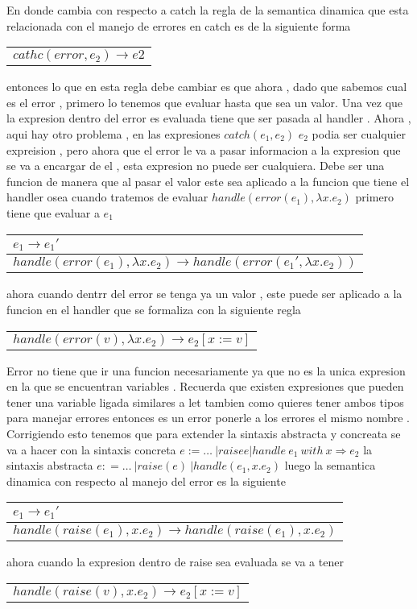 \documentclass[12p]{article}
\makeatletter
\newcommand{\logicarg}[2]{
  \begin{tabular}[t]{@{}l@{}}
    #1 \\ \hline #2 
  \end{tabular}
}
\makeatother
\begin{document}
En donde cambia con respecto a catch 
la regla de la semantica dinamica que esta relacionada con el manejo de errores en catch es de la 
siguiente forma \logicarg{}{$cathc(error,e_2) \rightarrow e2$} entonces lo que en esta regla debe cambiar 
es que ahora , dado que sabemos cual es el error , primero lo tenemos que evaluar hasta que sea un valor.
Una vez que la expresion dentro del error es evaluada tiene que ser pasada al handler . Ahora , aqui hay 
otro problema , en las expresiones $catch(e_1,e_2)$ $e_2$ podia ser cualquier expreision , pero ahora que 
el error le va a pasar informacion a la expresion que se va a encargar de el , esta expresion no puede ser 
cualquiera. Debe ser una funcion de manera que al pasar el valor este sea aplicado a la funcion que tiene  
el handler 
osea cuando tratemos de evaluar $handle(error(e_1),\lambda x. e_2)$ primero tiene que evaluar a $e_1$
\logicarg
{$e_1 \rightarrow e_1'$}
{$handle(error(e_1),\lambda x.e_2) \rightarrow handle(error(e_1',\lambda x.e_2))$}
ahora cuando dentrr del error se tenga ya un valor , este puede ser aplicado a la funcion en el handler 
que se formaliza con la siguiente regla
\logicarg{}{$handle(error(v),\lambda x.e_2 ) \rightarrow e_2[x:=v]$}

Error no tiene que ir una funcion necesariamente ya que no es la unica expresion en la que se encuentran 
variables . Recuerda que existen expresiones que pueden tener una variable ligada similares a let 
tambien como quieres tener ambos tipos para manejar errores entonces es un error ponerle a los errores el 
mismo nombre . Corrigiendo esto tenemos que para extender la sintaxis abstracta y concreata se va a hacer 
con 
la sintaxis concreta 
$e := \dots \ | raise e | handle \ e_1 \ with \ x \Rightarrow e_2$
la sintaxis abstracta 
$e : = \dots \ | raise(e) \ | handle(e_1,x.e_2) $
luego la semantica dinamica con respecto al manejo del error es la siguiente 
\logicarg{$e_1 \rightarrow e_1'$}{$handle(raise(e_1),x.e_2) \rightarrow handle(raise(e_1),x.e_2)$}
ahora cuando la expresion dentro de raise sea evaluada se va a tener 
\logicarg{}{$handle(raise(v),x.e_2) \rightarrow e_2[x:=v]$}
\end{document}
